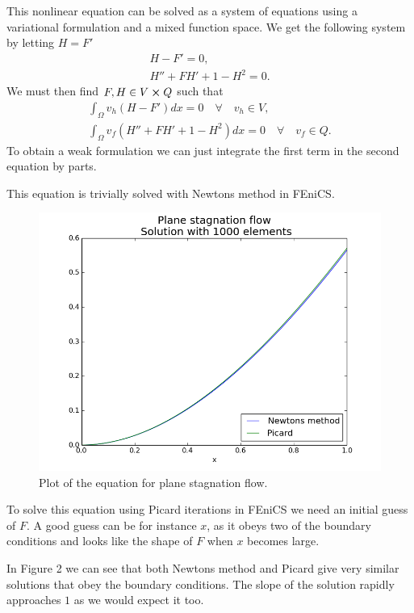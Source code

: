 \documentclass[11pt,a4paper,english]{article}
\numberwithin{equation}{section}
\begin{document}
This nonlinear equation can be solved as a system of equations using a variational formulation and a mixed function space. We get the following system by letting $H=F'$
\begin{align}
H - F' = 0, \\
H'' + FH' + 1 - H^2 = 0.
\end{align}
We must then find $F,H \in V \cross Q$ such that 
\begin{align*}
\int_\Omega v_h(H - F') dx =0 \quad \forall \quad v_h \in V, \\
\int_\Omega v_f(H'' + FH' + 1 - H^2) dx = 0 \quad \forall \quad  v_f \in Q.
\end{align*}
To obtain a weak formulation we can just integrate the first term in the second equation by parts. 

This equation is trivially solved with Newtons method in FEniCS.

\begin{figure}[h!]
\begin{center}
  \includegraphics[scale=0.4]{plane_stag.png}
  \end{center}
  \caption{Plot of the equation for plane stagnation flow.}
  \label{fig:stokes_square}
\end{figure}

To solve this equation using Picard iterations in FEniCS we need an initial guess of $F$. A good guess can be  for instance $x$, as it obeys two of the boundary conditions and looks like the shape of $F$ when $x$ becomes large.   

In Figure 2 we can see that both Newtons method and Picard give very similar solutions that obey the boundary conditions. The slope of the solution rapidly approaches $1$ as we would expect it too.     
\end{document}
